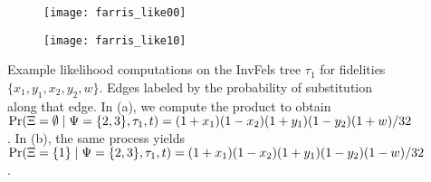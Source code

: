 \begin{figure}
\centering
\begin{subfigure}{.45\linewidth}
\centering
\texttt{[image: farris\_like00]}
\caption[short]{}
\end{subfigure}
\begin{subfigure}{.45\linewidth}
\centering
\texttt{[image: farris\_like10]}
\caption[short]{}
\end{subfigure}
\caption{
    Example likelihood computations on the InvFels tree $\tau_1$ for fidelities $\{x_1,y_1,x_2,y_2,w\}$.
    Edges labeled by the probability of substitution along that edge.
    In (a), we compute the product to obtain $\Pr(\Xi=\emptyset\mid \Psi=\{2,3\},\tau_1,t) = (1+x_1)(1-x_2)(1+y_1)(1-y_2)(1+w)/32$.
    In (b), the same process yields $\Pr(\Xi=\{1\}\mid \Psi=\{2,3\},\tau_1,t) = (1+x_1)(1-x_2)(1+y_1)(1-y_2)(1-w)/32$.
}
\label{fig:example_likelihoods}
\end{figure}

